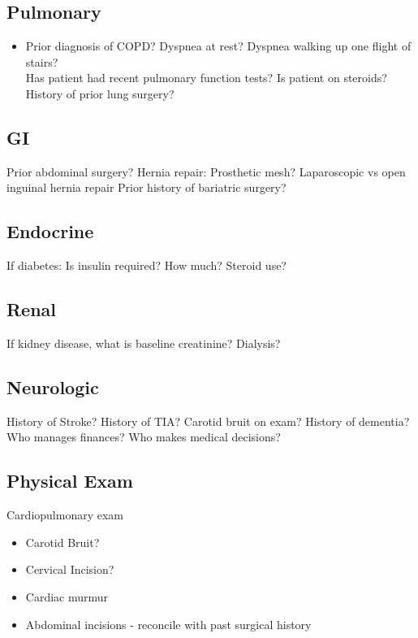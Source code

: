 \documentclass[
  letterpaper,
]{scrbook}
\providecommand{\tightlist}{%
  \setlength{\itemsep}{0pt}\setlength{\parskip}{0pt}}
\begin{document}
\subsection{Pulmonary}\label{pulmonary}

\begin{itemize}
\tightlist
\item
  Prior diagnosis of COPD? Dyspnea at rest? Dyspnea walking up one
  flight of stairs?\\
  Has patient had recent pulmonary function tests? Is patient on
  steroids? History of prior lung surgery?
\end{itemize}

\subsection{GI}\label{gi}

Prior abdominal surgery? Hernia repair: Prosthetic mesh? Laparoscopic vs
open inguinal hernia repair Prior history of bariatric surgery?

\subsection{Endocrine}\label{endocrine}

If diabetes: Is insulin required? How much? Steroid use?

\subsection{Renal}\label{renal}

If kidney disease, what is baseline creatinine? Dialysis?

\subsection{Neurologic}\label{neurologic}

History of Stroke? History of TIA? Carotid bruit on exam? History of
dementia?\\
Who manages finances? Who makes medical decisions?

\subsection{Physical Exam}\label{physical-exam}

Cardiopulmonary exam

\begin{itemize}
\item
  Carotid Bruit?
\item
  Cervical Incision?
\item
  Cardiac murmur
\item
  Abdominal incisions - reconcile with past surgical history
\end{itemize}
\end{document}
